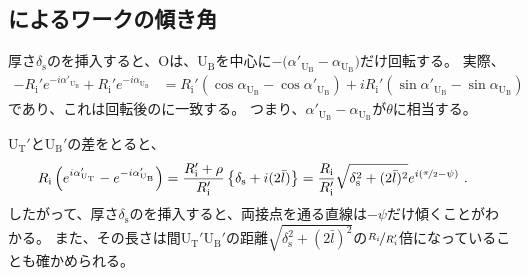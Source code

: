 \subsection{\Spacer によるワークの傾き角}
厚さ$\delta_\mathrm s$の\Spacer を挿入すると、\CurvatureCenter Oは、U$_\mathrm B$を中心に$-\big(\alpha'_{\mathrm U_\mathrm B}\!-\alpha_{\mathrm U_\mathrm B}\big)$だけ回転する。
実際、
\begin{align*}
  -R_\mathrm i'e^{-i\alpha'_{\mathrm U_\mathrm B}}+R_\mathrm i'e^{-i\alpha_{\mathrm U_\mathrm B}}
  &= R_\mathrm i'(\cos\alpha_{\mathrm U_\mathrm B}-\cos\alpha'_{\mathrm U_\mathrm B})
     +iR_\mathrm i'(\sin\alpha'_{\mathrm U_\mathrm B}-\sin\alpha_{\mathrm U_\mathrm B})
\end{align*}
であり、これは回転後の\nameCurvatureCenter{}に一致する。
つまり、$\alpha'_{\mathrm U_\mathrm B}\!-\alpha_{\mathrm U_\mathrm B}$が$\theta$に相当する。
\begin{hosoku}
\TopSideReceiverPlateContactPoint U$_\mathrm T'$と\BottomSideReceiverPlateContactPoint U$_\mathrm B'$の差をとると、
\begin{align*}
  R_\mathrm i\left(e^{i\alpha_{\mathrm U_\mathrm T}'}-e^{-i\alpha'_{\mathrm U_\mathrm B}}\right)
  &= \frac{R_\mathrm i'+\rho}{R_\mathrm i'}\left\{\delta_\mathrm s+i(2\bar l)\right\}
   = \frac{R_\mathrm i}{R_\mathrm i'}\sqrt{\delta_\mathrm s^2+(2\bar l)^2}e^{i(\nicefrac\pi2-\psi)}\ .
\end{align*}
したがって、厚さ$\delta_\mathrm s$の\Spacer を挿入すると、両接点を通る直線は$-\psi$だけ傾くことがわかる。
また、その長さは\ReceiverPlateCenter 間U$_\mathrm T'$U$_\mathrm B'$の距離$\sqrt{\delta_\mathrm s^2+(2\bar l)^2}$の$\nicefrac{R_i}{R_i'}$倍になっていることも確かめられる。
\end{hosoku}


